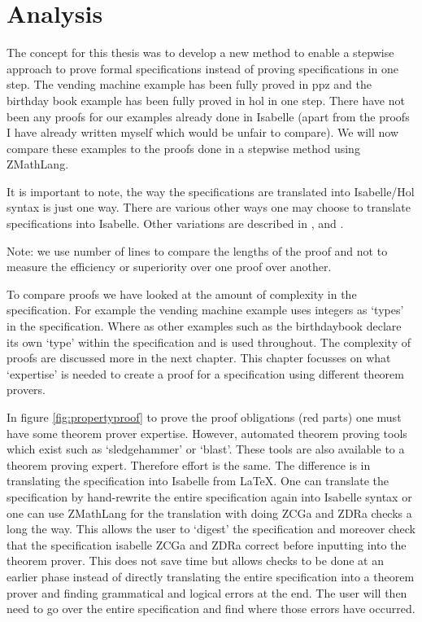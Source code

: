 \chapter{Analysis}
\label{ch:analysis}

The concept for this thesis was to develop a new method to enable a stepwise
approach to prove formal specifications instead of proving specifications
in one step. The vending machine example has been fully proved
in \gls{ppz} and the birthday book example has been fully proved in \gls{hol} in
one step.
There have not been any proofs for our examples already done in Isabelle (apart
from the proofs I have already written myself which would be unfair to compare).
We will now compare these examples to the proofs done in a
stepwise method using ZMathLang.

It is important to note, the way the specifications are translated into
Isabelle/Hol syntax is just one way. There are various other ways one may choose
to translate specifications into Isabelle. Other variations are
described in \cite{Kolyang1996}, \cite{Kolyang86towardsa} and \cite{hol-z}.

Note: we use number of lines to compare the lengths of the proof and not
to measure the efficiency  or superiority over one proof over another.

To compare proofs we have looked at the amount of complexity in the specification.
For example the vending machine example uses integers as `types' in the specification.
Where as other examples such as the birthdaybook declare its own `type' within
the specification and is used throughout. The complexity of proofs are discussed more in the
next chapter.
This chapter focusses on what `expertise' is needed to create a proof for a specification
using different theorem provers.

In figure \ref{fig:propertyproof} to prove the proof obligations (red parts) one must have some
theorem prover expertise. However, automated theorem proving tools which exist such as 
`sledgehammer' or `blast'. These tools are also available to a theorem proving expert. Therefore
effort is the same.
The difference is in translating the specification into Isabelle from \LaTeX. One can 
translate the specification by hand-rewrite the entire specification again into Isabelle syntax
or one can use ZMathLang for the translation with doing ZCGa and ZDRa checks a long the way.
This allows the user to `digest' the specification and moreover check that the specification isabelle
ZCGa and ZDRa correct before inputting into the theorem prover. This does not save time but 
allows checks to be done at an earlier phase instead of directly translating the entire specification
into a theorem prover and finding grammatical and logical errors at the end. The user will then
need to go over the entire specification and find where those errors have occurred.

